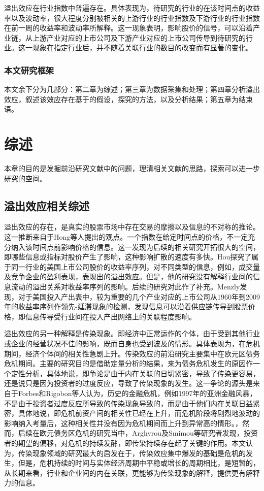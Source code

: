 \documentclass{sysuthesis}
\begin{document}
溢出效应在行业指数中普遍存在。具体表现为，待研究的行业的在该时间点的收益率以及波动率，很大程度分别被相关的上游行业的行业指数及下游行业的行业指数在前一周的收益率和波动率所解释。这一现象表明，影响股价的信号，可以沿着产业链，从上游产业对应的上市公司及下游产业对应的上市公司传导到待研究的行业。这一现象在指定行业后，并不随着关联行业的数目的改变而有显著的变化。

\subsection{本文研究框架}

本文余下分为几部分：第二章为综述；第三章为数据采集和处理；第四章分析溢出效应，叙述该效应存在基于的假设，探究的方法，以及分析结果；第五章为结束语。

\chapter{综述}
本章的目的是发掘前沿研究文献中的问题，理清相关文献的思路，探索可以进一步研究的空间。
\section{溢出效应相关综述}

溢出效应的存在，是真实的股票市场中存在交易的摩擦以及信息的不对称的推论。这一推断来自于Hong等人\cite{hong_industries_2002}提出的观点。一个指数在给定时间点的价格，不一定充分纳入该时间点前影响价格的信息。这一发现为后续的相关研究开拓很大的空间，即哪些信息或指标对股价产生了影响，这种影响扩散的速度有多快。Hou\cite{kewei_hou_industry_2007}探究了属于同一行业的美国上市公司股价的收益率序列，对不同类型的信息，例如，成交量及竞争企业的盈利表现，表现出的溢出效应。但是，他的研究没有解释行业间的信息流动的溢出关系对收益率序列的影响。后续的研究对此作了补充。Menzly\cite{menzly_market_2010}发现，对于美国投入产出表中，较为重要的几个产业对应的上市公司从1960年到2009年的收益率序列作领先-延滞现象的检测，发现信息可以沿着供应链传导到股票价格，即信息传导受行业间在投入产出网络上的关联程度影响。

溢出效应的另一种解释是传染现象。即经济中正常运作的个体，由于受到其他行业或企业的经营状况不佳的影响，既而自身也受到波及的情形。具体表现为，在危机期间，经济个体间的相关性急剧上升。传染效应的前沿研究主要集中在欧元区债务危机期间。主要的研究目的是借助定量分析的结果，来为债务危机发生的原因作一个定性分析，具体地说，即争论是由于内在关联的日切紧密，导致了传染更容易，还是说只是因为投资者的过度反应，导致了传染现象的发生。这一争论的源头是来自于Forbes和Rigobon等人认为，历史的金融危机，例如1997年的亚洲金融风暴，不是由于投资者过度反应所导致的传染现象导致的，而是由于他们内在关联日益紧密，具体地说，即危机前资产间的相关性已经在上升，而危机阶段将剧烈地波动的影响纳入考量后，这种相关性并没有因为危机期间而上升到异常高的情形。\cite{forbes_no_2002-1}，然而，后续在欧元债务区危机的研究当中，Arghyrou\cite{arghyrou_emu_2012}及Smimou等研究者发现\cite{smimou_intensity_2015}，投资者的期望的偏移，对危机的持续发酵，即传染持续存在起了关键的作用。本文认为，传染现象领域的研究最大的启发在于，传染效应集中爆发的基础是危机的发生，但是，危机持续的时间与实体经济周期中平稳或增长的周期相比，是短暂的，从长期来看，行业和企业间的内在关联，更能够为传染现象的解释，提供更有解释力的信息。
\end{document}
